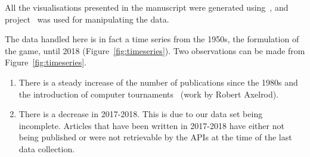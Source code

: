 \documentclass{article}
\theoremstyle{definition}
\begin{document}
\begin{table}[!hbtp]
    \begin{center}
    \end{center}
    \caption{Summary of~\citep{pd_data_2018} per provenance.}
    \label{table:preliminary_table}
\end{table}

All the visualisations presented in the manuscript were generated
using~\citep{hunter2007matplotlib}, and project~\citep{walt2011numpy} was used for
manipulating the data.

The data handled here is in fact a time series from the 1950s, the formulation
of the game, until 2018 (Figure~\ref{fig:timeseries}). Two observations can be
made from Figure~\ref{fig:timeseries}.

\begin{enumerate}
    \item There is a steady increase of the number of publications since the
    1980s and the introduction of computer tournaments~\citep{Axelrod1981}
    (work by Robert Axelrod).
    \item There is a decrease in 2017-2018. This is due to our data set being
    incomplete. Articles that have been written in 2017-2018 have either not
    being published or were not retrievable by the APIs at the time of the last
    data collection.
\end{enumerate}
\end{document}
